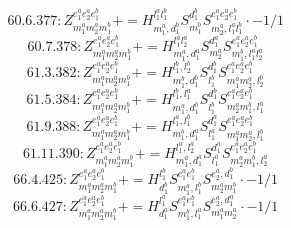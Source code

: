 \documentclass[letterpaper,10pt,fleqn,leqno,onecolumn]{article}
\begin{document}
\begin{equation} \;\;\;\;\;\;  60.6.377: Z^{e_{1}^{a}e_{2}^{a}e_{1}^{b}}_{m_{1}^{a}m_{2}^{a}m_{1}^{b}}+=H^{l_{1}^{a}l_{1}^{b}}_{m_{1}^{a},d_{1}^{b}}S^{d_{1}^{b}}_{m_{1}^{b}}S^{e_{1}^{a}e_{2}^{a}e_{1}^{b}}_{m_{2}^{a},l_{1}^{a}l_{1}^{b}}\cdot -1/1 \end{equation}
\begin{equation} \;\;\;\;\;\;  60.7.378: Z^{e_{1}^{a}e_{2}^{a}e_{1}^{b}}_{m_{1}^{a}m_{2}^{a}m_{1}^{b}}+=H^{l_{1}^{a}l_{2}^{a}}_{m_{1}^{a},d_{1}^{a}}S^{d_{1}^{a}}_{m_{2}^{a}}S^{e_{1}^{a}e_{2}^{a}e_{1}^{b}}_{m_{1}^{b},l_{1}^{a}l_{2}^{a}} \end{equation}
\begin{equation} \;\;\;\;\;\;  61.3.382: Z^{e_{1}^{a}e_{2}^{a}e_{1}^{b}}_{m_{1}^{a}m_{2}^{a}m_{1}^{b}}+=H^{l_{1}^{b},l_{2}^{b}}_{m_{1}^{b},d_{1}^{b}}S^{d_{1}^{b}}_{l_{1}^{b}}S^{e_{1}^{a}e_{2}^{a}e_{1}^{b}}_{m_{1}^{a}m_{2}^{a},l_{2}^{b}} \end{equation}
\begin{equation} \;\;\;\;\;\;  61.5.384: Z^{e_{1}^{a}e_{2}^{a}e_{1}^{b}}_{m_{1}^{a}m_{2}^{a}m_{1}^{b}}+=H^{l_{1}^{b},l_{1}^{a}}_{m_{1}^{a},d_{1}^{b}}S^{d_{1}^{b}}_{l_{1}^{b}}S^{e_{1}^{a}e_{2}^{a}e_{1}^{b}}_{m_{2}^{a}m_{1}^{b},l_{1}^{a}} \end{equation}
\begin{equation} \;\;\;\;\;\;  61.9.388: Z^{e_{1}^{a}e_{2}^{a}e_{1}^{b}}_{m_{1}^{a}m_{2}^{a}m_{1}^{b}}+=H^{l_{1}^{a},l_{1}^{b}}_{m_{1}^{b},d_{1}^{a}}S^{d_{1}^{a}}_{l_{1}^{a}}S^{e_{1}^{a}e_{2}^{a}e_{1}^{b}}_{m_{1}^{a}m_{2}^{a},l_{1}^{b}} \end{equation}
\begin{equation} \;\;\;\;\;\;  61.11.390: Z^{e_{1}^{a}e_{2}^{a}e_{1}^{b}}_{m_{1}^{a}m_{2}^{a}m_{1}^{b}}+=H^{l_{1}^{a},l_{2}^{a}}_{m_{1}^{a},d_{1}^{a}}S^{d_{1}^{a}}_{l_{1}^{a}}S^{e_{1}^{a}e_{2}^{a}e_{1}^{b}}_{m_{2}^{a}m_{1}^{b},l_{2}^{a}} \end{equation}
\begin{equation} \;\;\;\;\;\;  66.4.425: Z^{e_{1}^{a}e_{2}^{a}e_{1}^{b}}_{m_{1}^{a}m_{2}^{a}m_{1}^{b}}+=H^{l_{1}^{b}}_{d_{1}^{b}}S^{e_{1}^{a}e_{1}^{b}}_{m_{1}^{a},l_{1}^{b}}S^{e_{2}^{a},d_{1}^{b}}_{m_{2}^{a}m_{1}^{b}}\cdot -1/1 \end{equation}
\begin{equation} \;\;\;\;\;\;  66.6.427: Z^{e_{1}^{a}e_{2}^{a}e_{1}^{b}}_{m_{1}^{a}m_{2}^{a}m_{1}^{b}}+=H^{l_{1}^{a}}_{d_{1}^{a}}S^{e_{1}^{a}e_{1}^{b}}_{m_{1}^{b},l_{1}^{a}}S^{e_{2}^{a},d_{1}^{a}}_{m_{1}^{a}m_{2}^{a}}\cdot -1/1 \end{equation}
\end{document}

